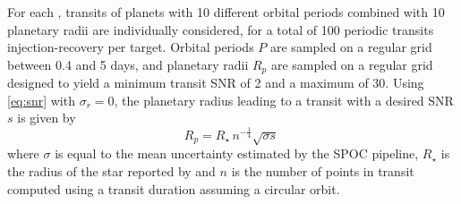 \documentclass[modern]{aastex631}
\begin{document}
For each , transits of planets with 10 different orbital periods combined with 10 planetary radii are individually considered, for a total of 100 periodic transits injection-recovery per target. Orbital periods $P$ are sampled on a regular grid between 0.4 and 5 days, and planetary radii $R_p$ are sampled on a regular grid designed to yield a minimum transit SNR of 2 and a maximum of 30. Using \autoref{eq:snr} with $\sigma_r = 0$, the planetary radius leading to a transit with a desired SNR $s$ is given by
\begin{equation*}
    R_p = R_{\star}\,n^{-\frac{1}{4}} \sqrt{\sigma s}\ %
\end{equation*}
where $\sigma$ is equal to the mean uncertainty estimated by the SPOC pipeline, $R_\star$ is the radius of the star reported by \cite{Ramsay2020} and $n$ is the number of points in transit computed using a transit duration assuming a circular orbit. \\\\
\end{document}
